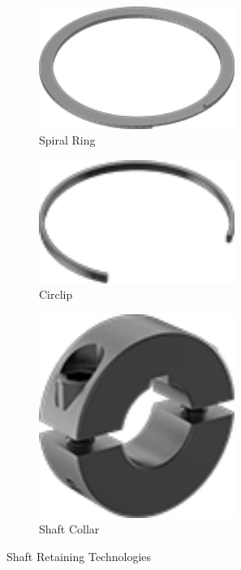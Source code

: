 \documentclass[10pt,letterpaper]{book}
\begin{document}
\begin{figure}[H]
		\begin{subfigure}[b]{.24\linewidth}
			\includegraphics[width=0.7\textwidth]{imgs/spiralring.png}
			\caption{Spiral Ring}
		\end{subfigure}\begin{subfigure}[b]{.24\linewidth}
			\includegraphics[width=0.7\textwidth]{imgs/circlip.png}
			\caption{Circlip}
		\end{subfigure}\begin{subfigure}[b]{.24\linewidth}
			\includegraphics[width=0.7\textwidth]{imgs/shaftcollar.png}
			\caption{Shaft Collar}
		\end{subfigure}
		\caption{Shaft Retaining Technologies}
	\end{figure}
	
\end{document}
